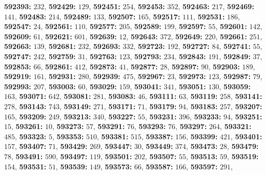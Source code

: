 \textsf{\bfseries 592393:} $232$, \textsf{\bfseries 592429:} $129$, \textsf{\bfseries 592451:} $254$, \textsf{\bfseries 592453:} $352$, \textsf{\bfseries 592463:} $217$, \textsf{\bfseries 592469:} $141$, \textsf{\bfseries 592483:} $214$, \textsf{\bfseries 592489:} $133$, \textsf{\bfseries 592507:} $165$, \textsf{\bfseries 592517:} $111$, \textsf{\bfseries 592531:} $186$, \textsf{\bfseries 592547:} $24$, \textsf{\bfseries 592561:} $110$, \textsf{\bfseries 592577:} $205$, \textsf{\bfseries 592589:} $199$, \textsf{\bfseries 592597:} $55$, \textsf{\bfseries 592601:} $142$, \textsf{\bfseries 592609:} $61$, \textsf{\bfseries 592621:} $601$, \textsf{\bfseries 592639:} $12$, \textsf{\bfseries 592643:} $372$, \textsf{\bfseries 592649:} $220$, \textsf{\bfseries 592661:} $251$, \textsf{\bfseries 592663:} $139$, \textsf{\bfseries 592681:} $232$, \textsf{\bfseries 592693:} $332$, \textsf{\bfseries 592723:} $192$, \textsf{\bfseries 592727:} $84$, \textsf{\bfseries 592741:} $55$, \textsf{\bfseries 592747:} $242$, \textsf{\bfseries 592759:} $31$, \textsf{\bfseries 592763:} $123$, \textsf{\bfseries 592793:} $234$, \textsf{\bfseries 592843:} $191$, \textsf{\bfseries 592849:} $37$, \textsf{\bfseries 592853:} $66$, \textsf{\bfseries 592861:} $412$, \textsf{\bfseries 592873:} $41$, \textsf{\bfseries 592877:} $28$, \textsf{\bfseries 592897:} $90$, \textsf{\bfseries 592903:} $189$, \textsf{\bfseries 592919:} $161$, \textsf{\bfseries 592931:} $280$, \textsf{\bfseries 592939:} $475$, \textsf{\bfseries 592967:} $23$, \textsf{\bfseries 592973:} $123$, \textsf{\bfseries 592987:} $79$, \textsf{\bfseries 592993:} $207$, \textsf{\bfseries 593003:} $60$, \textsf{\bfseries 593029:} $159$, \textsf{\bfseries 593041:} $341$, \textsf{\bfseries 593051:} $130$, \textsf{\bfseries 593059:} $163$, \textsf{\bfseries 593071:} $642$, \textsf{\bfseries 593081:} $281$, \textsf{\bfseries 593083:} $46$, \textsf{\bfseries 593111:} $63$, \textsf{\bfseries 593119:} $258$, \textsf{\bfseries 593141:} $278$, \textsf{\bfseries 593143:} $743$, \textsf{\bfseries 593149:} $271$, \textsf{\bfseries 593171:} $71$, \textsf{\bfseries 593179:} $94$, \textsf{\bfseries 593183:} $257$, \textsf{\bfseries 593207:} $165$, \textsf{\bfseries 593209:} $249$, \textsf{\bfseries 593213:} $340$, \textsf{\bfseries 593227:} $55$, \textsf{\bfseries 593231:} $396$, \textsf{\bfseries 593233:} $94$, \textsf{\bfseries 593251:} $15$, \textsf{\bfseries 593261:} $10$, \textsf{\bfseries 593273:} $57$, \textsf{\bfseries 593291:} $76$, \textsf{\bfseries 593293:} $76$, \textsf{\bfseries 593297:} $264$, \textsf{\bfseries 593321:} $485$, \textsf{\bfseries 593323:} $5$, \textsf{\bfseries 593353:} $510$, \textsf{\bfseries 593381:} $515$, \textsf{\bfseries 593387:} $156$, \textsf{\bfseries 593399:} $421$, \textsf{\bfseries 593401:} $157$, \textsf{\bfseries 593407:} $71$, \textsf{\bfseries 593429:} $269$, \textsf{\bfseries 593447:} $30$, \textsf{\bfseries 593449:} $374$, \textsf{\bfseries 593473:} $28$, \textsf{\bfseries 593479:} $78$, \textsf{\bfseries 593491:} $590$, \textsf{\bfseries 593497:} $119$, \textsf{\bfseries 593501:} $202$, \textsf{\bfseries 593507:} $55$, \textsf{\bfseries 593513:} $59$, \textsf{\bfseries 593519:} $154$, \textsf{\bfseries 593531:} $51$, \textsf{\bfseries 593539:} $149$, \textsf{\bfseries 593573:} $66$, \textsf{\bfseries 593587:} $166$, \textsf{\bfseries 593597:} $291$, 
